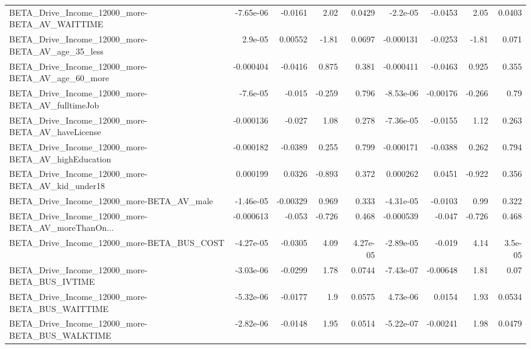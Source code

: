 \begin{tabular}{lrrrrrrrr}
BETA\_Drive\_Income\_12000\_more-BETA\_AV\_WAITTIME      &   -7.65e-06 &      -0.0161 &     2.02 &   0.0429 &   -2.2e-05 &     -0.0453 &         2.05 &        0.0403 \\
BETA\_Drive\_Income\_12000\_more-BETA\_AV\_age\_35\_less   &     2.9e-05 &      0.00552 &    -1.81 &   0.0697 &  -0.000131 &     -0.0253 &        -1.81 &         0.071 \\
BETA\_Drive\_Income\_12000\_more-BETA\_AV\_age\_60\_more   &   -0.000404 &      -0.0416 &    0.875 &    0.381 &  -0.000411 &     -0.0463 &        0.925 &         0.355 \\
BETA\_Drive\_Income\_12000\_more-BETA\_AV\_fulltimeJob   &    -7.6e-05 &       -0.015 &   -0.259 &    0.796 &  -8.53e-06 &    -0.00176 &       -0.266 &          0.79 \\
BETA\_Drive\_Income\_12000\_more-BETA\_AV\_haveLicense   &   -0.000136 &       -0.027 &     1.08 &    0.278 &  -7.36e-05 &     -0.0155 &         1.12 &         0.263 \\
BETA\_Drive\_Income\_12000\_more-BETA\_AV\_highEducation &   -0.000182 &      -0.0389 &    0.255 &    0.799 &  -0.000171 &     -0.0388 &        0.262 &         0.794 \\
BETA\_Drive\_Income\_12000\_more-BETA\_AV\_kid\_under18   &    0.000199 &       0.0326 &   -0.893 &    0.372 &   0.000262 &      0.0451 &       -0.922 &         0.356 \\
BETA\_Drive\_Income\_12000\_more-BETA\_AV\_male          &   -1.46e-05 &     -0.00329 &    0.969 &    0.333 &  -4.31e-05 &     -0.0103 &         0.99 &         0.322 \\
BETA\_Drive\_Income\_12000\_more-BETA\_AV\_moreThanOn... &   -0.000613 &       -0.053 &   -0.726 &    0.468 &  -0.000539 &      -0.047 &       -0.726 &         0.468 \\
BETA\_Drive\_Income\_12000\_more-BETA\_BUS\_COST         &   -4.27e-05 &      -0.0305 &     4.09 & 4.27e-05 &  -2.89e-05 &      -0.019 &         4.14 &       3.5e-05 \\
BETA\_Drive\_Income\_12000\_more-BETA\_BUS\_IVTIME       &   -3.03e-06 &      -0.0299 &     1.78 &   0.0744 &  -7.43e-07 &    -0.00648 &         1.81 &          0.07 \\
BETA\_Drive\_Income\_12000\_more-BETA\_BUS\_WAITTIME     &   -5.32e-06 &      -0.0177 &      1.9 &   0.0575 &   4.73e-06 &      0.0154 &         1.93 &        0.0534 \\
BETA\_Drive\_Income\_12000\_more-BETA\_BUS\_WALKTIME     &   -2.82e-06 &      -0.0148 &     1.95 &   0.0514 &  -5.22e-07 &    -0.00241 &         1.98 &        0.0479 \\

\end{tabular}
